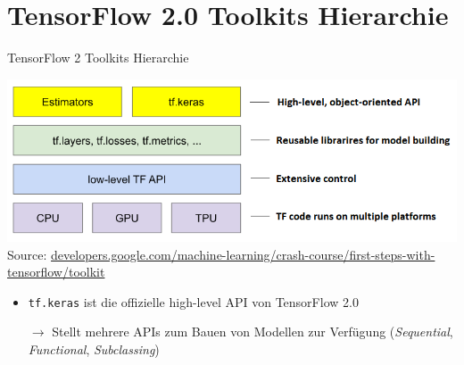 \documentclass[utf8, smaller, c]{beamer}
\renewcommand{\tt}[1]{{\texttt{#1}}}
\begin{document}
\section{TensorFlow 2.0 Toolkits Hierarchie}
\begin{frame}[fragile]{TensorFlow 2 Toolkits Hierarchie}
    \begin{center}
        \includegraphics[scale=0.5]{pics/tf_hierarchy}\\
        {\tiny Source: \url{developers.google.com/machine-learning/crash-course/first-steps-with-tensorflow/toolkit}}
    \end{center}
    \begin{itemize}
        \item \tt{tf.keras} ist die offizielle high-level API von TensorFlow 2.0
        \item[$\rightarrow$] Stellt mehrere APIs zum Bauen von Modellen zur Verfügung (\textit{Sequential}, \textit{Functional}, \textit{Subclassing})
    \end{itemize}
\end{frame}

\end{document}
